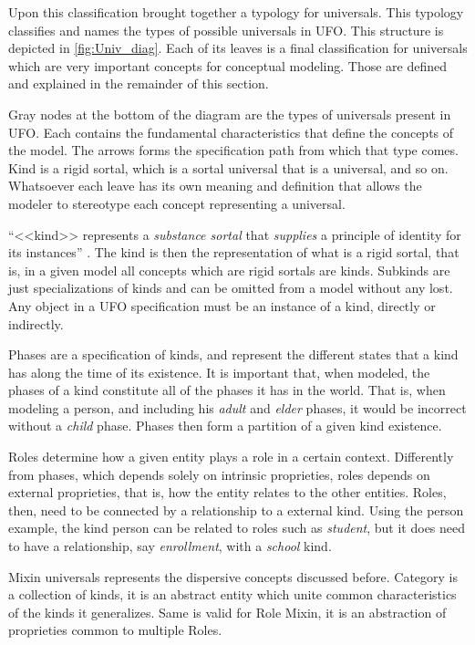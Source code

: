 Upon this classification \citeauthor{guizzardi_ontological_2005} brought together a typology for universals. This typology classifies and names the types of possible universals in UFO. This structure is depicted in \autoref{fig:Univ_diag}. Each of its leaves is a final classification for universals which are very important concepts for conceptual modeling. Those are defined and explained in the remainder of this section.



Gray nodes at the bottom of the diagram are the types of universals present in UFO. Each contains the fundamental characteristics that define the concepts of the model. The arrows forms the specification path from which that type comes. Kind is a rigid sortal, which is a sortal universal that is a universal, and so on. Whatsoever each leave has its own meaning and definition that allows the modeler to stereotype each concept representing a universal.

``<<kind>> represents a \textit{substance sortal} that \textit{supplies} a principle of identity for its instances'' \citep{guizzardi_ontological_2005}. The kind is then the representation of what is a rigid sortal, that is, in a given model all concepts which are rigid sortals are kinds. Subkinds are just specializations of kinds and can be omitted from a model without any lost. Any object in a UFO specification must be an instance of a kind, directly or indirectly.

Phases are a specification of kinds, and represent the different states that a kind has along the time of its existence. It is important that, when modeled, the phases of a kind constitute all of the phases it has in the world. That is, when modeling a person, and including his \textit{adult} and \textit{elder} phases, it would be incorrect without a \textit{child} phase. Phases then form a partition of a given kind existence.

Roles determine how a given entity plays a role in a certain context. Differently from phases, which depends solely on intrinsic proprieties, roles depends on external proprieties, that is, how the entity relates to the other entities. Roles, then, need to be connected by a relationship to a external  kind. Using the person example, the kind person can be related to roles such as \textit{student}, but it does need to have a relationship, say \textit{enrollment}, with a \textit{school} kind. 

Mixin universals represents the dispersive concepts discussed before. Category is a collection of kinds, it is an abstract entity which unite common characteristics of the kinds it generalizes. Same is valid for Role Mixin, it is an abstraction of proprieties common to multiple Roles. 

